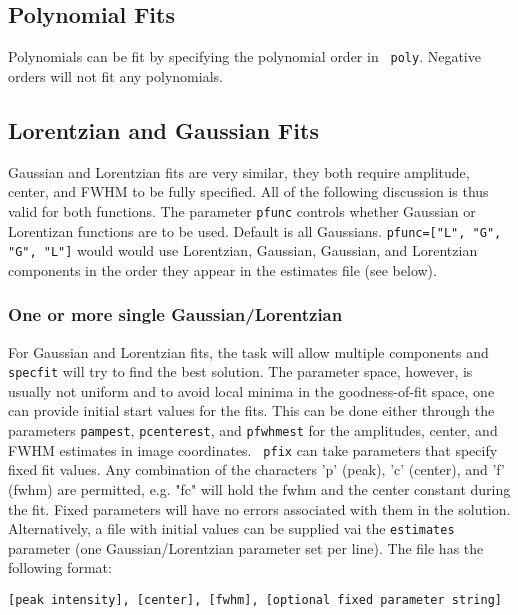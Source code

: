 \subsection{Polynomial Fits}
\label{section:analysis.specfit.poly}

Polynomials can be fit by specifying the polynomial order in {\tt
  poly}. Negative orders will not fit any polynomials. 

\subsection{Lorentzian and Gaussian Fits}
\label{section:analysis.specfit.lorgau}

Gaussian and Lorentzian fits are very similar, they both require
amplitude, center, and FWHM to be fully specified. All of the
following discussion is thus valid for both functions. The parameter
{\tt pfunc} controls whether Gaussian or Lorentizan functions are to
be used. Default is all Gaussians. {\tt pfunc=["L", "G", "G", "L"]}
would would use Lorentzian, Gaussian, Gaussian, and Lorentzian
components in the order they appear in the estimates file (see below).

\subsubsection{One or more single Gaussian/Lorentzian}
\label{section:analysis.specfit.lorgau.single}

For Gaussian and Lorentzian fits, the task will allow multiple
components and {\tt specfit} will try to find the best solution. The
parameter space, however, is usually not uniform and to avoid local
minima in the goodness-of-fit space, one can provide initial start
values for the fits. This can be done either through the parameters
{\tt pampest}, {\tt pcenterest}, and {\tt pfwhmest} for the
amplitudes, center, and FWHM estimates in image coordinates. {\tt
  pfix} can take parameters that specify fixed fit values.  Any
combination of the characters 'p' (peak), 'c' (center), and 'f' (fwhm)
are permitted, e.g. "fc" will hold the fwhm and the center constant
during the fit. Fixed parameters will have no errors associated with
them in the solution.  Alternatively, a file with initial values can
be supplied vai the {\tt estimates} parameter (one Gaussian/Lorentzian parameter
set per line). The file has the following format:

{\tt [peak intensity], [center], [fwhm], [optional fixed parameter string]}

